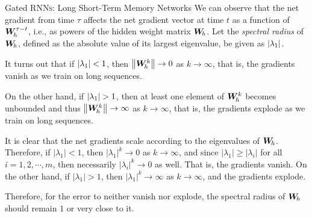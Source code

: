 \begin{frame}{Gated RNN\textsc{s}: Long Short-Term Memory Networks}
We can observe that the net gradient from time $\tau$ affects the
net gradient vector at time $t$ as a function of ${\boldsymbol W}_{\!h}^{\tau-t}$,
i.e., as powers of the hidden weight matrix ${\boldsymbol W}_{\!h}$. Let the {\em
spectral radius} of ${\boldsymbol W}_{\!h}$, defined as the absolute value of its largest
eigenvalue, be
given as $\lvert\lambda_1\rvert$. 

\medskip


It turns out that if $\lvert\lambda_1\rvert < 1$,
then $\left\lVert{\boldsymbol W}_{\!h}^{k}\right\rVert \to 0$ as $k \to
\infty$, that is, the gradients vanish as we train on
long sequences. 


\medskip

On the other hand, if $\lvert\lambda_1\rvert > 1$, then at
least one element of ${\boldsymbol W}_{\!h}^{k}$ becomes unbounded and thus 
$\left\lVert{\boldsymbol W}_{\!h}^{k}\right\rVert \to \infty$ as $k \to \infty$, 
that is, the gradients
explode as we train on long sequences. 

\medskip

It is clear that the net gradients scale according to the eigenvalues of
${\boldsymbol W}_{\!h}$. Therefore, if $|\lambda_1| < 1$, then $|\lambda_1|^{k} \to 0$
as $k \to \infty$, and since $|\lambda_1| \ge |\lambda_i|$ for all
$i=1,2,\cdots,m$, then necessarily $|\lambda_i|^{k} \to 0$ as well.
That is, the gradients vanish.
On the other hand, if $|\lambda_1| > 1$, then $|\lambda_1|^{k} \to
\infty$
as $k \to \infty$, and the gradients explode.


\medskip

Therefore, for the error to
neither vanish nor explode, the spectral radius of ${\boldsymbol W}_{\!h}$ should
remain $1$ or very close to it.
\end{frame}
